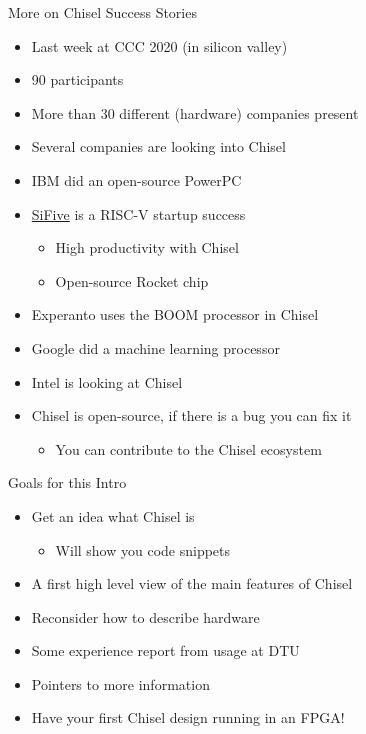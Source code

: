 \documentclass[xcolor=pdflatex,dvipsnames,table]{beamer}
\begin{document}

\begin{frame}[fragile]{More on Chisel Success Stories}
\begin{itemize}
\item Last week at CCC 2020 (in silicon valley)
\item 90 participants
\item More than 30 different (hardware) companies present
\item Several companies are looking into Chisel
\item IBM did an open-source PowerPC
\item \href{https://www.sifive.com/}{SiFive} is a RISC-V startup success
\begin{itemize}
\item High productivity with Chisel
\item Open-source Rocket chip
\end{itemize}
\item Experanto uses the BOOM processor in Chisel
\item Google did a machine learning processor
\item Intel is looking at Chisel
\item Chisel is open-source, if there is a bug you can fix it
\begin{itemize}
\item You can contribute to the Chisel ecosystem
\end{itemize}
\end{itemize}
\end{frame}

\begin{frame}[fragile]{Goals for this Intro}
\begin{itemize}
\item Get an idea what Chisel is
\begin{itemize}
\item Will show you code snippets
\end{itemize}
\item A first high level view of the main features of Chisel
\item Reconsider how to describe hardware
\item Some experience report from usage at DTU
\item Pointers to more information
\item Have your first Chisel design running in an FPGA!
\end{itemize}
\end{frame}
\end{document}
